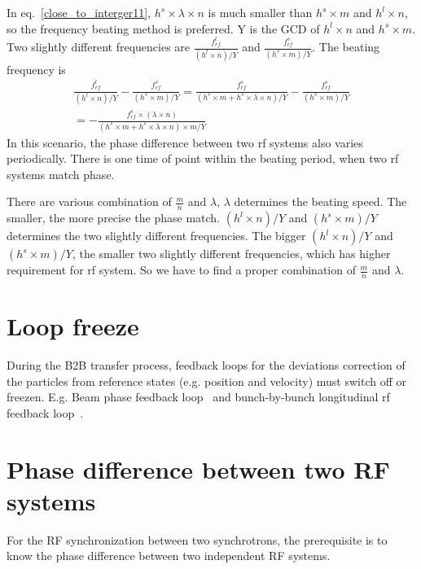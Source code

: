 In eq.~\ref{close_to_interger11}, $h^s \times\lambda\times n$ is much smaller than $h^s \times m$ and $h^l\times n$, so the frequency beating method is preferred. Y is the GCD of $h^l\times n$ and $h^s \times m$. Two slightly different frequencies are $\frac{f_{\mathit{rf}}^{l}}{(h^l\times n)/Y}$ and $\frac{f_{\mathit{rf}}^{s}}{(h^s\times m)/Y}$. The beating frequency is
\begin{equation} 
\begin{split}
\frac{f_{\mathit{rf}}^{l}}{(h^l\times n)/Y} - \frac{f_{\mathit{rf}}^{s}}{(h^s\times m)/Y}=\frac{f_{\mathit{rf}}^{s}}{(h^s \times m+ h^s \times\lambda\times n)/Y} - \frac{f_{\mathit{rf}}^{s}}{(h^s\times m)/Y}\\=-\frac{f_{\mathit{rf}}^{s}\times(\lambda\times n)}{(h^s \times m+ h^s \times\lambda\times n) \times m/Y} 
\end{split}
\end{equation}
In this scenario, the phase difference between two rf systems also varies periodically. There is one time of point within the beating period, when two rf systems match phase. 

There are various combination of $\frac{m}{n}$ and $\lambda$, $\lambda$ determines the beating speed. The smaller, the more precise the phase match. $(h^l\times n)/Y$ and $(h^s\times m)/Y$ determines the two slightly different frequencies. The bigger $(h^l\times n)/Y$ and $(h^s\times m)/Y$, the smaller two slightly different frequencies, which has higher requirement for rf system. So we have to find a proper combination of $\frac{m}{n}$ and $\lambda$.



\section{Loop freeze}

During the B2B transfer process, feedback loops for the deviations correction of the particles from reference states (e.g. position and velocity) must switch off or freezen. E.g. Beam phase feedback loop~\cite{grieser_beam_2015} and bunch-by-bunch longitudinal rf feedback loop~\cite{gross_bunch-by-bunch_2015}.

\section{Phase difference between two RF systems}
\label{sec:phase_diff}
For the RF synchronization between two synchrotrons, the prerequisite is to know the phase difference between two independent RF systems. 
  
